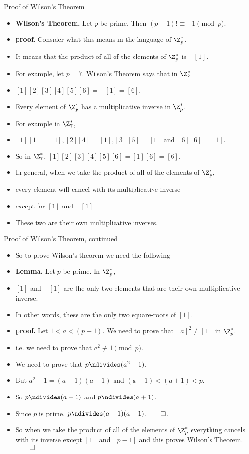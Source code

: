 \documentclass[handout]{beamer}
\begin{document}
\begin{frame}{Proof of Wilson's Theorem}

\begin{itemize}
  \item \textbf{Wilson's Theorem.} Let $p$ be prime. Then $(p-1)! \equiv -1 \pmod p$.
  \item \textbf{proof}. Consider what this means in the language of $\Z_p^*$.
  \item It means that the product of all of the elements of $\Z_p^*$ is $-[1]$.
  \item For example, let $p=7$. Wilson's Theorem says that in $\Z_7^*$,
  \item $[1][2][3][4][5][6] = -[1] = [6]$.
  \item Every element of $\Z_p^*$ has a multiplicative inverse in $\Z_p^*$.
  \item For example in $\Z_7^*$,
  \item $[1][1]=[1], [2][4]=[1],[3][5]=[1]$ and $[6][6] = [1]$.
  \item So in $\Z_7^*$, $[1][2][3][4][5][6] = [1][6] = [6]$.
  \item In general, when we take the product of all of the elements of $\Z_p^*$,
  \item every element will cancel with its multiplicative inverse
  \item except for $[1]$ and $-[1]$.
  \item These two are their own multiplicative inverses.
\end{itemize}

\end{frame}

\begin{frame}{Proof of Wilson's Theorem, continued}
\begin{itemize}
  \item So to prove Wilson's theorem we need the following
  \item \textbf{Lemma.} Let $p$ be prime. In $\Z_p^*$,
  \item $[1]$ and $-[1]$ are the only two elements that are their own multiplicative inverse.
  \item In other words, these are the only two square-roots of $[1]$.
  \item \textbf{proof.} Let $1<a<(p-1)$. We need to prove that $[a]^2 \neq [1]$ in $\Z_p^*$.
  \item i.e. we need to prove that $a^2 \not\equiv 1 \pmod p$.
  \item We need to prove that $p\ndivides (a^2 - 1)$.
  \item But $a^2 - 1 = (a-1)(a+1)$ and $(a-1)<(a+1)<p$.
  \item So $p\ndivides (a-1)$ and $p\ndivides (a+1)$.
  \item Since $p$ is prime, $p\ndivides (a-1)(a+1)$.$\qed$.
  \item So when we take the product of all of the elements of $\Z_p^*$ everything cancels with its inverse except $[1]$ and $[p-1]$ and this proves Wilson's Theorem. $\qed$
\end{itemize}

\end{frame}
\end{document}
